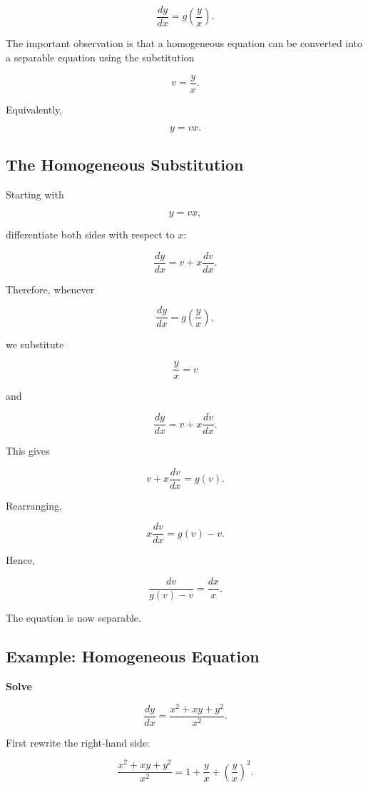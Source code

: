 \documentclass[11pt]{article}
\begin{document}
\[
\boxed{
\frac{dy}{dx}=g\left(\frac{y}{x}\right)
}.
\]

The important observation is that a homogeneous equation can be
converted into a separable equation using the substitution

\[
\boxed{
v=\frac{y}{x}
}.
\]

Equivalently,

\[
y=vx.
\]

\subsection{The Homogeneous Substitution}

Starting with

\[
y=vx,
\]

differentiate both sides with respect to $x$:

\[
\frac{dy}{dx}
=
v+x\frac{dv}{dx}.
\]

Therefore, whenever

\[
\frac{dy}{dx}
=
g\left(\frac{y}{x}\right),
\]

we substitute

\[
\frac{y}{x}=v
\]

and

\[
\frac{dy}{dx}
=
v+x\frac{dv}{dx}.
\]

This gives

\[
v+x\frac{dv}{dx}=g(v).
\]

Rearranging,

\[
x\frac{dv}{dx}=g(v)-v.
\]

Hence,

\[
\frac{dv}{g(v)-v}
=
\frac{dx}{x}.
\]

The equation is now separable.

\subsection{Example: Homogeneous Equation}

\textbf{Solve}

\[
\frac{dy}{dx}
=
\frac{x^2+xy+y^2}{x^2}.
\]

First rewrite the right-hand side:

\[
\frac{x^2+xy+y^2}{x^2}
=
1+\frac{y}{x}
+\left(\frac{y}{x}\right)^2.
\]
\end{document}
